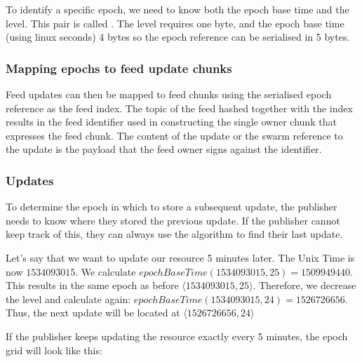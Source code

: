 To identify a specific epoch, we need to know both the epoch base time and the level. This pair is called . 
The level requires one byte, and the epoch base time (using linux seconds)  4 bytes so the epoch reference can be serialised in 5 bytes. 

\subsubsection{Mapping epochs to feed update chunks}

Feed updates can then be mapped to feed chunks using the serialised epoch reference as the feed index. The topic of the feed hashed together with the index results in the feed identifier used in constructing the single owner chunk that expresses the feed chunk. The content of  the update or the swarm reference to the update is the payload that the feed owner signs against the identifier.


\subsubsection{Updates}

To determine the epoch in which to store a subsequent update, the publisher needs to know where they stored the previous update. If the publisher cannot keep track of this, they can always use the algorithm to find their last update.

Let's say that we want to update our resource 5 minutes later. The Unix Time is now $1534093015$.
We calculate $\mathit{epochBaseTime}(1534093015, 25) = 1509949440$.
This results in the same epoch as before $\langle  1534093015, 25\rangle$. Therefore, we decrease the level and calculate again:
$\mathit{epochBaseTime}(1534093015, 24) = 1526726656$. Thus, the next update will be located at $\langle  1526726656, 24\rangle$

If the publisher keeps updating the resource exactly every 5 minutes, the epoch grid will look like this:


